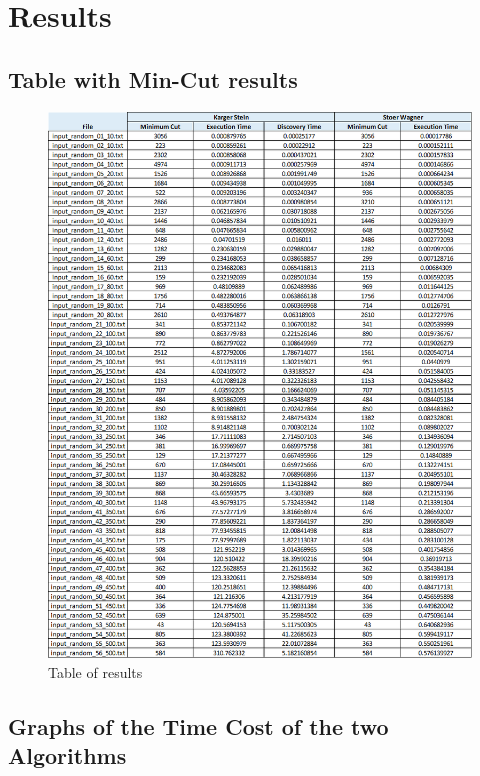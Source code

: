 \section{Results}\label{results}

\subsection{Table with Min-Cut results}

\begin{figure}[H]
	\hspace{0cm}\includegraphics[width=17cm]{Img/results.png}
	\caption{Table of results}
\end{figure}
	

\subsection{Graphs of the Time Cost of the two Algorithms}

